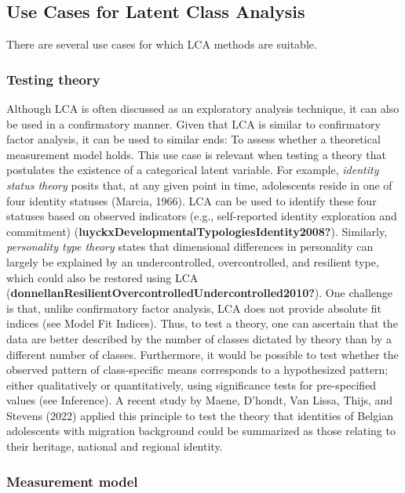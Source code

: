 \documentclass[
  ,man,floatsintext]{apa6}
\begin{document}
\hypertarget{use-cases-for-latent-class-analysis}{%
\subsection{Use Cases for Latent Class Analysis}\label{use-cases-for-latent-class-analysis}}

There are several use cases for which LCA methods are suitable.

\hypertarget{testing-theory}{%
\subsubsection{Testing theory}\label{testing-theory}}

Although LCA is often discussed as an exploratory analysis technique,
it can also be used in a confirmatory manner.
Given that LCA is similar to confirmatory factor analysis,
it can be used to similar ends:
To assess whether a theoretical measurement model holds.
This use case is relevant when testing a theory that postulates the existence of a categorical latent variable.
For example, \emph{identity status theory} posits that, at any given point in time, adolescents reside in one of four identity statuses (Marcia, 1966).
LCA can be used to identify these four statuses based on observed indicators (e.g., self-reported identity exploration and commitment) (\textbf{luyckxDevelopmentalTypologiesIdentity2008?}).
Similarly, \emph{personality type theory} states that dimensional differences in personality can largely be explained by an undercontrolled, overcontrolled, and resilient type, which could also be restored using LCA (\textbf{donnellanResilientOvercontrolledUndercontrolled2010?}).
One challenge is that, unlike confirmatory factor analysis, LCA does not provide absolute fit indices (see Model Fit Indices).
Thus, to test a theory, one can ascertain that the data are better described by the number of classes dictated by theory than by a different number of classes.
Furthermore, it would be possible to test whether the observed pattern of class-specific means corresponds to a hypothesized pattern;
either qualitatively or quantitatively, using significance tests for pre-specified values (see Inference).
A recent study by Maene, D'hondt, Van Lissa, Thijs, and Stevens (2022) applied this principle to
test the theory that identities of Belgian adolescents with migration background could be summarized as those relating to their heritage, national and regional identity.

\hypertarget{measurement-model}{%
\subsubsection{Measurement model}\label{measurement-model}}
\end{document}

